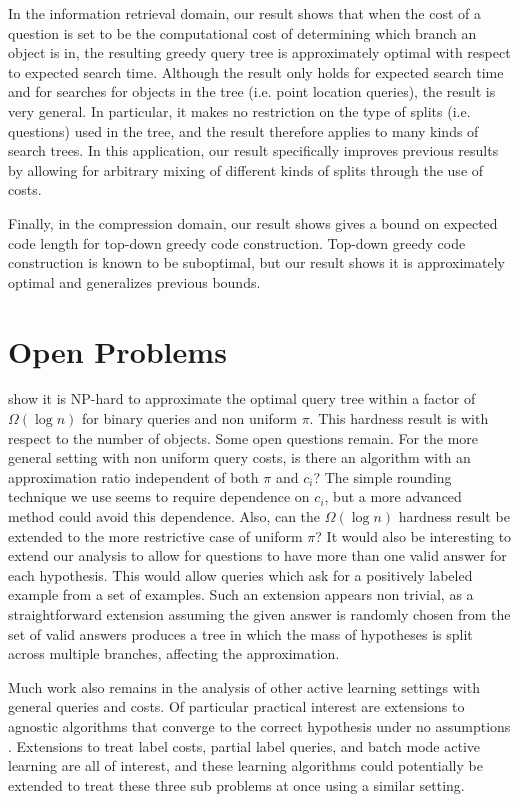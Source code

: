 \documentclass{article}
\begin{document}
In the information retrieval domain, our result shows that when the
cost of a question is set to be the computational cost of determining
which branch an object is in, the resulting greedy query tree is
approximately optimal with respect to expected search time.  Although
the result only holds for expected search time and for searches for
objects in the tree (i.e. point location queries), the result is very
general.  In particular, it makes no restriction on the type of splits
(i.e. questions) used in the tree, and the result therefore applies to
many kinds of search trees.  In this application, our result
specifically improves previous results by allowing for arbitrary mixing of
different kinds of splits through the use of costs.

Finally, in the compression domain, our result shows gives a bound
on expected code length for top-down greedy code construction.  Top-down
greedy code construction is known to be suboptimal, but our result shows
it is approximately optimal and generalizes previous bounds.

\section{Open Problems}

\citet{decisiontreesentity} show it is NP-hard to approximate the
optimal query tree within a factor of $\Omega (\log n)$ for binary
queries and non uniform $\pi$.  This hardness result is with respect
to the number of objects.  Some open questions remain.  For the more
general setting with non uniform query costs, is there an algorithm
with an approximation ratio independent of both $\pi$ and $c_i$?  The
simple rounding technique we use seems to require dependence on $c_i$, but a
more advanced method could avoid this dependence.  Also, can the
$\Omega (\log n)$ hardness result be extended to the more restrictive
case of uniform $\pi$?  It would also be interesting to extend our
analysis to allow for questions to have more than one valid answer for
each hypothesis.  This would allow queries which ask for a positively
labeled example from a set of examples.  Such an extension appears
non trivial, as a straightforward extension assuming the given answer
is randomly chosen from the set of valid answers produces a tree in which
the mass of hypotheses is split across multiple branches, affecting
the approximation.

Much work also remains in the analysis of 
other active learning settings with general queries and costs.  
Of particular practical interest are extensions to agnostic
algorithms that converge to the correct hypothesis under no
assumptions \citep{generalagnostic, importance}.  Extensions to 
treat label costs, partial label queries, and batch mode active learning
are all of interest, and these learning algorithms could potentially
be extended to treat these three sub problems at once using a similar
setting.  
\end{document}
